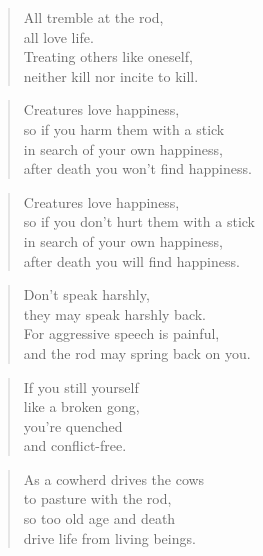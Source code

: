 \documentclass[12pt,openany]{book}%
\begin{document}
\begin{verse}%
All tremble at the rod, \\
all love life. \\
Treating others like oneself, \\
neither kill nor incite to kill. 

%
\end{verse}

\begin{verse}%
Creatures love happiness, \\
so if you harm them with a stick \\
in search of your own happiness, \\
after death you won’t find happiness. 

%
\end{verse}

\begin{verse}%
Creatures love happiness, \\
so if you don’t hurt them with a stick \\
in search of your own happiness, \\
after death you will find happiness. 

%
\end{verse}

\begin{verse}%
Don’t speak harshly, \\
they may speak harshly back. \\
For aggressive speech is painful, \\
and the rod may spring back on you. 

%
\end{verse}

\begin{verse}%
If you still yourself \\
like a broken gong, \\
you’re quenched \\
and conflict-free. 

%
\end{verse}

\begin{verse}%
As a cowherd drives the cows \\
to pasture with the rod, \\
so too old age and death \\
drive life from living beings. 

%
\end{verse}
\end{document}
